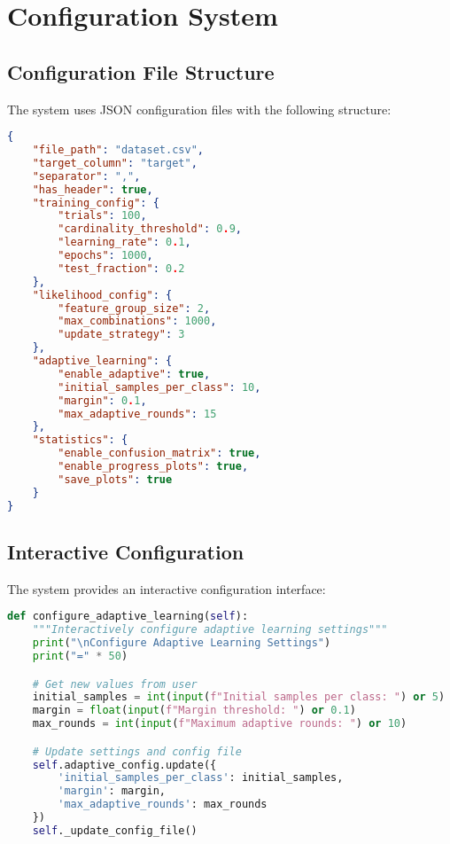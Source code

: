 \documentclass[11pt]{article}
\begin{document}
\section{Configuration System}

\subsection{Configuration File Structure}

The system uses JSON configuration files with the following structure:

\begin{lstlisting}[language=JSON]
{
    "file_path": "dataset.csv",
    "target_column": "target",
    "separator": ",",
    "has_header": true,
    "training_config": {
        "trials": 100,
        "cardinality_threshold": 0.9,
        "learning_rate": 0.1,
        "epochs": 1000,
        "test_fraction": 0.2
    },
    "likelihood_config": {
        "feature_group_size": 2,
        "max_combinations": 1000,
        "update_strategy": 3
    },
    "adaptive_learning": {
        "enable_adaptive": true,
        "initial_samples_per_class": 10,
        "margin": 0.1,
        "max_adaptive_rounds": 15
    },
    "statistics": {
        "enable_confusion_matrix": true,
        "enable_progress_plots": true,
        "save_plots": true
    }
}
\end{lstlisting}

\subsection{Interactive Configuration}

The system provides an interactive configuration interface:

\begin{lstlisting}[language=Python]
def configure_adaptive_learning(self):
    """Interactively configure adaptive learning settings"""
    print("\nConfigure Adaptive Learning Settings")
    print("=" * 50)

    # Get new values from user
    initial_samples = int(input(f"Initial samples per class: ") or 5)
    margin = float(input(f"Margin threshold: ") or 0.1)
    max_rounds = int(input(f"Maximum adaptive rounds: ") or 10)

    # Update settings and config file
    self.adaptive_config.update({
        'initial_samples_per_class': initial_samples,
        'margin': margin,
        'max_adaptive_rounds': max_rounds
    })
    self._update_config_file()
\end{lstlisting}
\end{document}
